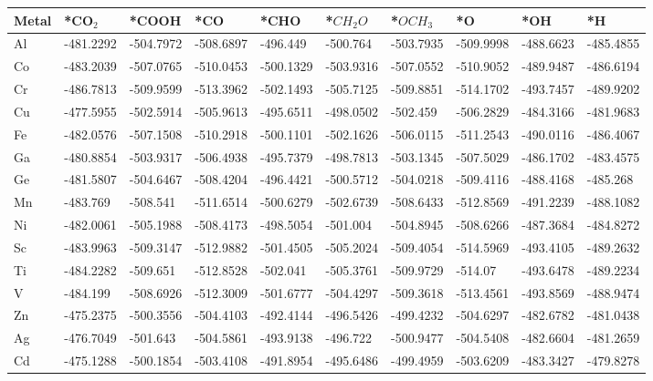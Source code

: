 \begin{table}[h]
  \centering
  {\fontsize{6}{12}\selectfont
  \begin{tabular}{*{10}{l}}
    \hline
    Metal & *CO$_2$ & *COOH & *CO & *CHO & *$CH_2O$ & *$OCH_3$ & *O & *OH & *H \\
    \hline
    Al & -481.2292 & -504.7972 & -508.6897 & -496.449  & -500.764  & -503.7935 & -509.9998 & -488.6623 & -485.4855 \\
    Co & -483.2039 & -507.0765 & -510.0453 & -500.1329 & -503.9316 & -507.0552 & -510.9052 & -489.9487 & -486.6194 \\
    Cr & -486.7813 & -509.9599 & -513.3962 & -502.1493 & -505.7125 & -509.8851 & -514.1702 & -493.7457 & -489.9202 \\
    Cu & -477.5955 & -502.5914 & -505.9613 & -495.6511 & -498.0502 & -502.459  & -506.2829 & -484.3166 & -481.9683 \\
    Fe & -482.0576 & -507.1508 & -510.2918 & -500.1101 & -502.1626 & -506.0115 & -511.2543 & -490.0116 & -486.4067 \\
    Ga & -480.8854 & -503.9317 & -506.4938 & -495.7379 & -498.7813 & -503.1345 & -507.5029 & -486.1702 & -483.4575 \\
    Ge & -481.5807 & -504.6467 & -508.4204 & -496.4421 & -500.5712 & -504.0218 & -509.4116 & -488.4168 & -485.268  \\
    Mn & -483.769  & -508.541  & -511.6514 & -500.6279 & -502.6739 & -508.6433 & -512.8569 & -491.2239 & -488.1082 \\
    Ni & -482.0061 & -505.1988 & -508.4173 & -498.5054 & -501.004  & -504.8945 & -508.6266 & -487.3684 & -484.8272 \\
    Sc & -483.9963 & -509.3147 & -512.9882 & -501.4505 & -505.2024 & -509.4054 & -514.5969 & -493.4105 & -489.2632 \\
    Ti & -484.2282 & -509.651  & -512.8528 & -502.041  & -505.3761 & -509.9729 & -514.07   & -493.6478 & -489.2234 \\
    V  & -484.199  & -508.6926 & -512.3009 & -501.6777 & -504.4297 & -509.3618 & -513.4561 & -493.8569 & -488.9474 \\
    Zn & -475.2375 & -500.3556 & -504.4103 & -492.4144 & -496.5426 & -499.4232 & -504.6297 & -482.6782 & -481.0438 \\
    Ag & -476.7049 & -501.643  & -504.5861 & -493.9138 & -496.722  & -500.9477 & -504.5408 & -482.6604 & -481.2659 \\
    Cd & -475.1288 & -500.1854 & -503.4108 & -491.8954 & -495.6486 & -499.4959 & -503.6209 & -483.3427 & -479.8278 \\

\end{tabular}}
\end{table}
